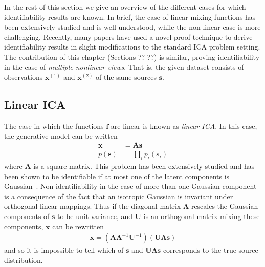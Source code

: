 In the rest of this section we give an overview of the different cases for which identifiability results are known. 
In brief, the case of linear mixing functions has been extensively studied and is well understood, while the non-linear case is more challenging.
Recently, many papers have used a novel proof technique to derive identifiability results in slight modifications to the standard ICA problem setting.
The contribution of this chapter (Sections ??-??) is similar, proving identifiability in the case of \emph{multiple nonlinear views}. 
That is, the given dataset consists of observations $\bm{x}^{(1)}$ and $\bm{x}^{(2)}$ of the same sources $\bm{s}$.



\subsection{Linear ICA}



The case in which the functions $\bm{f}$ are linear is known as \emph{linear ICA}. 
In this case, the generative model can be written
\begin{align*}
\bm{x} &= \bm{A}\bm{s} \\
p(\bm{s}) &= \prod_{i} p_i(s_i)
\end{align*}
where $\bm{A}$ is a square matrix.
This problem has been extensively studied and has been shown to be identifiable if at most one of the latent components is Gaussian~\citep{darmois1953analyse, skitovich1954linear, comon1994independent}.
Non-identifiability in the case of more than one Gaussian component is a consequence of the fact that an isotropic Gaussian is invariant under orthogonal linear mappings.
Thus if the diagonal matrix $\bm{\Lambda}$ rescales the Gaussian components of $\bm{s}$ to be unit variance, and $\bm{U}$ is an orthogonal matrix mixing these components, $\bm{x}$ can be rewritten
%
\begin{align*}
\bm{x} = \left(\bm{A}\bm{\Lambda}^{-1}\bm{U}^{-1} \right) \left(\bm{U}\bm{\Lambda} \bm{s}\right)
\end{align*}
%
and so it is impossible to tell which of $\bm{s}$ and $\bm{U}\bm{\Lambda} \bm{s}$ corresponds to the true source distribution. 


